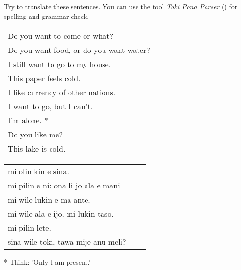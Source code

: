 Try to translate these sentences.
You can use the tool \textit{Toki Pona Parser} (\cite{www:rowa:02}) for spelling and grammar check.

\begin{supertabular}{p{5,5cm}|ll}
    Do you want to come or what?            \\
    Do you want food, or do you want water? \\
    I still want to go to my house.         \\
    This paper feels cold.                  \\
    I like currency of other nations.       \\
    I want to go, but I can't.              \\
    I'm alone. *                            \\
    Do you like me?    &  &                 \\
    This lake is cold. &  &                 \\
\end{supertabular}

\begin{supertabular}{p{5,5cm}|ll}
    mi olin kin e sina.                  \\
    mi pilin e ni: ona li jo ala e mani. \\
    mi wile lukin e ma ante.             \\
    mi wile ala e ijo. mi lukin taso.    \\
    mi pilin lete.                       \\
    sina wile toki, tawa mije anu meli?  \\
\end{supertabular}

* Think: 'Only I am present.'